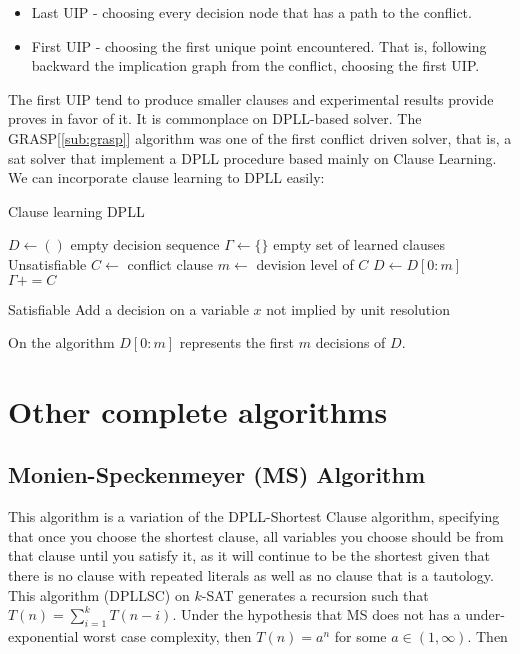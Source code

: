 \begin{itemize}
\item Last UIP - choosing every decision node that has a path to the conflict.
\item First UIP - choosing the first unique point encountered. That is, following backward the implication graph from the conflict, choosing the first UIP.
\end{itemize}


The first UIP tend to produce smaller clauses and experimental results \cite{tichy2006clause} \cite{zhang2001efficient} provide proves in favor of it. It is commonplace on DPLL-based solver. The GRASP[\ref{sub:grasp}] algorithm was one of the first conflict driven solver, that is, a sat solver that implement a DPLL procedure based mainly on Clause Learning. \\

We can incorporate clause learning to DPLL easily:
\begin{algorithm}    
  \caption{Clause learning DPLL \cite{darwiche2009complete}}\label{cldpll}
  \begin{algorithmic}[1]
    \State $D \gets ()$ empty decision sequence
	\State $\Gamma \gets \{\}$ empty set of learned clauses
			 \Return Unsatisfiable
			\Else
				\State $C \gets $ conflict clause
				\State $m \gets $ devision level of $C$
				\State $D \gets D[0:m]$ 
				\State $\Gamma += C$
			\EndIf

		\Else
				\State\Return Satisfiable
			\Else
				\State Add a decision on a variable $x$ not implied by unit resolution 
			\EndIf
		\EndIf
	\EndWhile
\EndProcedure
\end{algorithmic}
\end{algorithm}

On the algorithm $D[0:m]$ represents the first $m$ decisions of $D$.


\section{Other complete algorithms}

\subsection{Monien-Speckenmeyer (MS) Algorithm}
\label{alg:MS}
This algorithm is a variation of the DPLL-Shortest Clause algorithm, specifying that once you choose the shortest clause, all variables you choose should be from that clause until you satisfy it, as it will continue to be the shortest given that there is no clause with repeated literals as well as no clause that is a tautology. This algorithm (DPLLSC) on $k$-SAT generates a recursion such that $T(n) = \sum_{i=1}^kT(n-i)$. Under the hypothesis that MS does not has a under-exponential worst case complexity, then $T(n) = a^n$ for some $a \in (1,\infty)$.  Then

